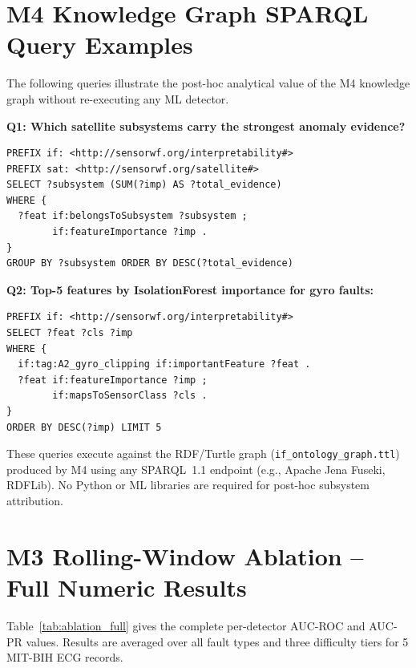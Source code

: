 \documentclass[conference]{IEEEtran}
\begin{document}
\section{M4 Knowledge Graph SPARQL Query Examples}
\label{app:sparql}

The following queries illustrate the post-hoc analytical value of the M4 knowledge graph without re-executing any ML detector.

\noindent\textbf{Q1: Which satellite subsystems carry the strongest anomaly evidence?}
\begin{lstlisting}[basicstyle=\ttfamily\scriptsize]
PREFIX if: <http://sensorwf.org/interpretability#>
PREFIX sat: <http://sensorwf.org/satellite#>
SELECT ?subsystem (SUM(?imp) AS ?total_evidence)
WHERE {
  ?feat if:belongsToSubsystem ?subsystem ;
        if:featureImportance ?imp .
}
GROUP BY ?subsystem ORDER BY DESC(?total_evidence)
\end{lstlisting}

\noindent\textbf{Q2: Top-5 features by IsolationForest importance for gyro faults:}
\begin{lstlisting}[basicstyle=\ttfamily\scriptsize]
PREFIX if: <http://sensorwf.org/interpretability#>
SELECT ?feat ?cls ?imp
WHERE {
  if:tag:A2_gyro_clipping if:importantFeature ?feat .
  ?feat if:featureImportance ?imp ;
        if:mapsToSensorClass ?cls .
}
ORDER BY DESC(?imp) LIMIT 5
\end{lstlisting}

These queries execute against the RDF/Turtle graph (\texttt{if\_ontology\_graph.ttl}) produced by M4 using any SPARQL~1.1 endpoint (e.g., Apache Jena Fuseki, RDFLib). No Python or ML libraries are required for post-hoc subsystem attribution.

\section{M3 Rolling-Window Ablation -- Full Numeric Results}
\label{app:ablation}

Table~\ref{tab:ablation_full} gives the complete per-detector AUC-ROC and AUC-PR values. Results are averaged over all fault types and three difficulty tiers for 5 MIT-BIH ECG records.
\end{document}
